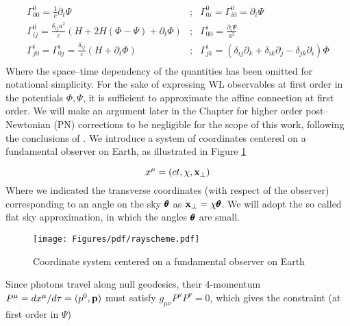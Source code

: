 \begin{equation}
\label{eq:2:connection}
\begin{matrix}
\Gamma_{00}^0 = \frac{1}{c}\partial_t\Psi & ; & \Gamma_{0i}^0=\Gamma_{i0}^0 = \partial_i\Psi \\  
\Gamma_{ij}^0 = \frac{\delta_{ij}a^2}{c}(H+2H(\Phi-\Psi)+\partial_t\Phi) & ; & \Gamma_{00}^i = \frac{\partial_i \Psi}{a^2} \\
\Gamma^i_{j0} = \Gamma^i_{0j} = \frac{\delta_{ij}}{c}(H+\partial_t\Phi) & ; & \Gamma_{jk}^i = (\delta_{ij}\partial_k+\delta_{ik}\partial_j-\delta_{jk}\partial_i)\Phi\\
\end{matrix}
\end{equation}
%
Where the space--time dependency of the quantities has been omitted for notational simplicity. For the sake of expressing WL observables at first order in the potentials $\Phi,\Psi$, it is sufficient to approximate the affine connection at first order. We will make an argument later in the Chapter for higher order post--Newtonian (PN) corrections to be negligible for the scope of this work, following the conclusions of \citep{PNLensing}. We introduce a system of coordinates centered on a fundamental observer on Earth, as illustrated in Figure \ref{fig:2:scheme}

\begin{equation}
\label{eq:2:coord}
x^{\mu} = (ct,\chi,\mathbf{x}_\perp)
\end{equation}
%
Where we indicated the transverse coordinates (with respect of the observer) corresponding to an angle on the sky $\pmb{\theta}$ as $\mathbf{x}_\perp=\chi\pmb{\theta}$. We will adopt the so called flat sky approximation, in which the angles $\pmb{\theta}$ are small. 

\begin{figure}
\begin{center}
\texttt{[image: Figures/pdf/rayscheme.pdf]}
\end{center}
\caption{Coordinate system centered on a fundamental observer on Earth}
\label{fig:2:scheme}
\end{figure}
%
Since photons travel along null geodesics, their 4-momentum $P^\mu=dx^\mu/d\tau=(p^0,\mathbf{p})$ must satisfy $g_{\mu\nu}P^{\mu}P^{\nu}=0$, which gives the constraint (at first order in $\Psi$)

